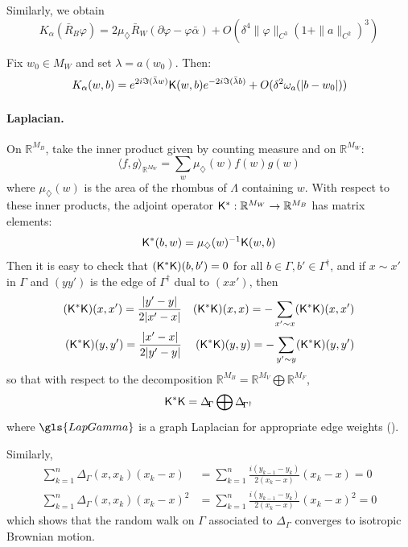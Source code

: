 \documentclass[10pt]{article}
\newcommand{\R}{\mathbb{R}}
\newcommand{\rK}{{\sf K}}
\newcommand{\dg}{\dagger}
\newcommand{\dmd}{\diamondsuit}
\newcommand{\Lap}{\Delta\!}
\begin{document}
%

Similarly, we obtain
$$K_\alpha(\bar R_B\varphi)=2\mu_\dmd \bar R_W(\partial\varphi-\varphi\bar\alpha)
+O(\delta^4\|\varphi\|_{C^3}(1+\|a\|_{C^2})^3)$$


%
%
%
%
%
%
%
%
%
%
%
%

Fix $w_0\in M_W$ and set $\lambda=a(w_0)$. Then:
\begin{equation}\label{eq:close}
K_\alpha(w,b)=e^{2i\Im(\bar\lambda w)}\rK(w,b)e^{-2i\Im(\bar\lambda b)}+O(\delta^2\omega_a(|b-w_0|))
\end{equation}


\paragraph{Laplacian.\\}

On $\R^{M_B}$, take the inner product given by counting measure and on $\R^{M_W}$:
$$\langle f,g\rangle_{\R^{M_W}}=\sum_{w}\mu_\dmd(w)f(w)g(w)$$
where $\mu_\dmd(w)$ is the area of the rhombus of $\Lambda$ containing $w$. With respect to these inner products, the adjoint operator $\rK^*:\R^{M_W}\rightarrow\R^{M_B}$ has matrix elements:
$$\rK^*(b,w)=\mu_\dmd(w)^{-1} \rK(w,b)$$
Then it is easy to check that $(\rK^*\rK)(b,b')=0$ for all $b\in \Gamma,b'\in \Gamma^\dg$, and if $x\sim x'$ in $\Gamma$ and $(yy')$ is the edge of $\Gamma^\dg$ dual to $(xx')$, then
\begin{align*}
(\rK^*\rK)(x,x')=\frac{|y'-y|}{2|x'-x|}&&(\rK^*\rK)(x,x)=-\sum_{x'\sim x}(\rK^*\rK)(x,x')\\
 (\rK^*\rK)(y,y')=\frac{|x'-x|}{2|y'-y|}&&(\rK^*\rK)(y,y)=-\sum_{y'\sim y}(\rK^*\rK)(y,y')
\end{align*}
so that with respect to the decomposition $\R^{M_B}=\R^{M_V}\bigoplus\R^{M_F}$, 
\begin{equation}\label{eq:KstarK}
\rK^*\rK=\Lap_\Gamma\bigoplus\Lap_{\Gamma^\dg}
\end{equation}
where $\gls{LapGamma}$ is a graph Laplacian for appropriate edge weights (\cite{Ken_isoradial}).

Similarly, 
\begin{align*}
\sum_{k=1}^n\Lap_\Gamma(x,x_k)(x_k-x)&=\sum_{k=1}^n\frac{i(y_{k-1}-y_k)}{2(x_k-x)}(x_k-x)=0\\
\sum_{k=1}^n\Lap_\Gamma(x,x_k)(x_k-x)^2&=\sum_{k=1}^n\frac{i(y_{k-1}-y_k)}{2(x_k-x)}(x_k-x)^2=0
\end{align*}
which shows that the random walk on $\Gamma$ associated to $\Lap_\Gamma$ converges to isotropic Brownian motion. 
\end{document}
